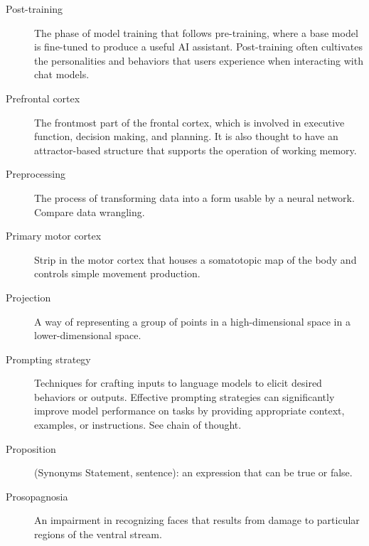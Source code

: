 \begin{description}

\item[Post-training] The phase of model training that follows pre-training, where a base model is fine-tuned to produce a useful AI assistant. Post-training often cultivates the personalities and behaviors that users experience when interacting with chat models.

\item[Prefrontal cortex] The frontmost part of the frontal cortex, which is involved in executive function, decision making, and planning. It is also thought to have an attractor-based structure that supports the operation of working memory.

\item[Preprocessing] The process of transforming data into a form usable by a neural network. Compare data wrangling.


\item[Primary motor cortex] Strip in the motor cortex that houses a somatotopic map of the body and controls simple movement production.

\item[Projection] A way of representing a group of points in a high-dimensional space in a lower-dimensional space.

\item[Prompting strategy] Techniques for crafting inputs to language models to elicit desired behaviors or outputs. Effective prompting strategies can significantly improve model performance on tasks by providing appropriate context, examples, or instructions. See chain of thought.

\item[Proposition] (Synonyms Statement, sentence): an expression that can be true or false.


\item[Prosopagnosia] An impairment in recognizing faces that results from damage to particular regions of the ventral stream.


\end{description}
